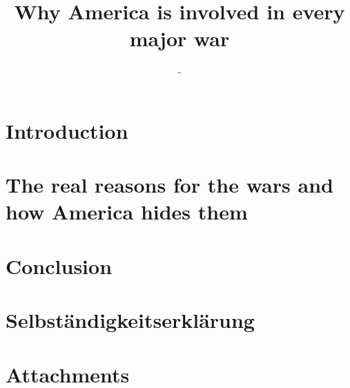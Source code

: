 \documentclass[12pt,a4paper]{article}
\title{Why America is involved in every major war}
\author{-}
\begin{document}
	
	\clearpage
	\newpage
	\tableofcontents
	\newpage
	\section{Introduction}
		
	\section{The real reasons for the wars and how America hides them}
		
		
	\section{Conclusion}
		
	\section{Selbständigkeitserklärung}
	
	\section{Attachments}
\end{document}
